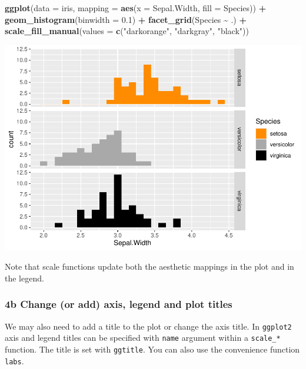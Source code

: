 \documentclass[
]{article}
\newenvironment{Shaded}{\begin{snugshade}}{\end{snugshade}}
\newcommand{\AttributeTok}[1]{\textcolor[rgb]{0.13,0.29,0.53}{#1}}
\newcommand{\FloatTok}[1]{\textcolor[rgb]{0.00,0.00,0.81}{#1}}
\newcommand{\FunctionTok}[1]{\textcolor[rgb]{0.13,0.29,0.53}{\textbf{#1}}}
\newcommand{\NormalTok}[1]{#1}
\newcommand{\SpecialCharTok}[1]{\textcolor[rgb]{0.81,0.36,0.00}{\textbf{#1}}}
\newcommand{\StringTok}[1]{\textcolor[rgb]{0.31,0.60,0.02}{#1}}
\begin{document}
\begin{Shaded}
\begin{Highlighting}[]
\FunctionTok{ggplot}\NormalTok{(}\AttributeTok{data =}\NormalTok{ iris, }\AttributeTok{mapping =} \FunctionTok{aes}\NormalTok{(}\AttributeTok{x =}\NormalTok{ Sepal.Width, }\AttributeTok{fill =}\NormalTok{ Species)) }\SpecialCharTok{+}
  \FunctionTok{geom\_histogram}\NormalTok{(}\AttributeTok{binwidth =} \FloatTok{0.1}\NormalTok{) }\SpecialCharTok{+}
  \FunctionTok{facet\_grid}\NormalTok{(Species }\SpecialCharTok{\textasciitilde{}}\NormalTok{ .) }\SpecialCharTok{+}
  \FunctionTok{scale\_fill\_manual}\NormalTok{(}\AttributeTok{values =} \FunctionTok{c}\NormalTok{(}\StringTok{"darkorange"}\NormalTok{, }\StringTok{"darkgray"}\NormalTok{, }\StringTok{"black"}\NormalTok{))}
\end{Highlighting}
\end{Shaded}

\begin{center}\includegraphics{P1_exercises_files/figure-latex/change-col-ggplot2-1} \end{center}

Note that scale functions update both the aesthetic mappings in the plot
and in the legend.

\subsubsection{\texorpdfstring{\textbf{4b} \textbar{} Change (or add)
axis, legend and plot
titles}{4b \textbar{} Change (or add) axis, legend and plot titles}}\label{b-change-or-add-axis-legend-and-plot-titles}

We may also need to add a title to the plot or change the axis title. In
\texttt{ggplot2} axis and legend titles can be specified with
\texttt{name} argument within a \texttt{scale\_*} function. The title is
set with \texttt{ggtitle}. You can also use the convenience function
\texttt{labs}.
\end{document}
